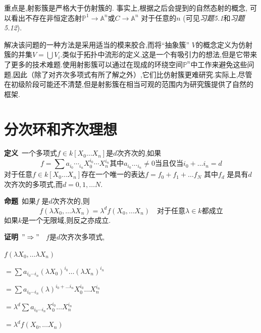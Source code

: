 \documentclass[UTF8]{book}
\begin{document}
		
		重点是,射影簇是严格大于仿射簇的. 事实上,根据之后会提到的自然态射的概念, 可以看出不存在非恒定态射$\mathbb{P} ^{1} \rightarrow \mathbb{A} ^{n}$或$C \rightarrow \mathbb{A}^{n}$ 对于任意的$n$ (可见\textit{习题5.1}和\textit{习题5.12}).
		
		
		解决该问题的一种方法是采用适当的模来胶合,而将“抽象簇” $ V $的概念定义为仿射簇的并集$ V = \bigcup V _ {i} $.类似于拓扑中流形的定义,这是一个有吸引力的想法,但是它带来了更多的技术难题.使用射影簇可以通过在现成的环绕空间$ \mathbb{P} ^ {n}$中工作来避免这些问题,因此（除了对齐次多项式有所了解之外）,它们比仿射簇更难研究.实际上,尽管在初级阶段可能还不清楚,但是射影簇在相当可观的范围内为研究簇提供了自然的框架.
		
	\section{分次环和齐次理想}
		\textbf{定义}\ 一个多项式$f \in k \left[ X _{0} \ldots X _{ n }\right]$是$ d $次齐次的,如果
		\begin{equation*}
			f =\sum a _{ i _{0}} \cdots _{i_{ n }} X _{0}^{ i _{0}} \cdots X _{ n }^{ i _{ n }} \text{其中} a _{ i _{0}} \ldots _{i_{ n }} \neq 0 \text{当且仅当} i _{0}+\ldots i _{ n }= d
		\end{equation*}
		对于任意$f \in k \left[ X _{0} \ldots X _{ n }\right]$存在一个唯一的表达$f = f _{0}+ f _{1}+\ldots f _{ N }$ 其中$f _{ d }$ 是具有$ d $次齐次的多项式,而$d =0,1, \ldots N$.
		
		
		\textbf{命题}\ 如果$f$ 是$ d $次齐次的,则
		\begin{equation*}
		f \left(\lambda X _{0}, \ldots \lambda X _{ n }\right)=\lambda^{d} f \left( X _{0}, \ldots X _{ n }\right) \quad \text {对于任意}\lambda \in k\text{都成立}
		\end{equation*}
		如果$k$是一个无限域,则反之亦成立.
		
		
		\textbf{证明}\  $"\Rightarrow" $ \ $ f $是$ d $次齐次多项式,
		
		$f \left(\lambda X _{0}, \ldots \lambda X _{ n }\right)$
		
		
		$=\sum a _{ i _{0}\cdots i _{ n } }(\lambda X _{0})^{ i _{0}} \ldots (\lambda X _{ n })^{ i _{ n }}$
		
		
		$=\sum a _{ i _{0}\cdots i _{ n } }(\lambda)^{i _{0}+ \ldots i _{ n }}X _{0}^{ i _{0}} \ldots X _{ n }^{ i _{ n }}$
		
		
		$=\lambda^{d}\sum a _{ i _{0}\cdots i _{ n } }X _{0}^{ i _{0}} \ldots X _{ n }^{ i _{ n }}$
		
		
		$=\lambda^{d}f \left( X _{0}, \ldots X _{ n }\right)$
		
\end{document}
